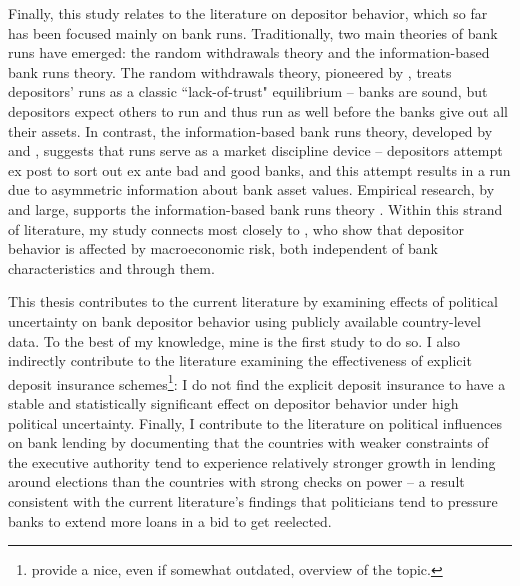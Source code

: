 \documentclass[12pt,a4paper]{article}
\begin{document}
Finally, this study relates to the literature on depositor behavior, which so far has been focused mainly on bank runs. Traditionally, two main theories of bank runs have emerged: the random withdrawals theory and the information-based bank runs theory. The random withdrawals theory, pioneered by \citet{diamond1983bank}, treats depositors' runs as a classic ``lack-of-trust" equilibrium -- banks are sound, but depositors expect others to run and thus run as well before the banks give out all their assets. In contrast, the information-based bank runs theory, developed by \citet{jacklin1988distinguishing} and \citet{calomiris1991role}, suggests that runs serve as a market discipline device -- depositors attempt ex post to sort out ex ante bad and good banks, and this attempt results in a run due to asymmetric information about bank asset values. Empirical research, by and large, supports the information-based bank runs theory \citep[see, for example,][]{martinez2001depositors}. Within this strand of literature, my study connects most closely to \citet{levy2010depositor}, who show that depositor behavior is affected by macroeconomic risk, both independent of bank characteristics and through them.

This thesis contributes to the current literature by examining effects of political uncertainty on bank depositor behavior using publicly available country-level data. To the best of my knowledge, mine is the first study to do so. I also indirectly contribute to the literature examining the effectiveness of explicit deposit insurance schemes\footnote{\citet{asli2002deposit} provide a nice, even if somewhat outdated, overview of the topic.}: I do not find the explicit deposit insurance to have a stable and statistically significant effect on depositor behavior under high political uncertainty. Finally, I contribute to the literature on political influences on bank lending by documenting that the countries with weaker constraints of the executive authority tend to experience relatively stronger growth in lending around elections than the countries with strong checks on power -- a result consistent with the current literature's findings that politicians tend to pressure banks to extend more loans in a bid to get reelected.
\end{document}

